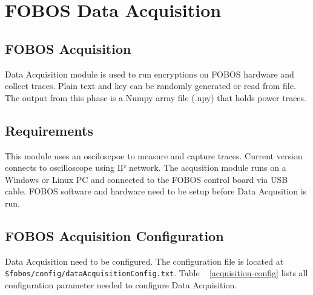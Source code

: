\chapter{FOBOS Data Acquisition} \label{chap:dataAcquisition}

\section{FOBOS Acquisition}
Data Acquisition module is used to run encryptions on FOBOS hardware and collect traces. Plain text and key can be randomly generated or read from file. The output from this phase is a Numpy array file (.npy) that holds power traces.

\section{Requirements}
This module uses an osciloscpoe to measure and capture traces. Current version connects to oscilloscope using IP network.
The acqusition module runs on a Windows or Linux PC and connected to the FOBOS control board via USB cable.
FOBOS software and hardware need to be setup before Data Acqusition is run.

\section{FOBOS Acquisition Configuration}

Data Acquisition need to be configured. The configuration file is located at \texttt{\$fobos/config/dataAcquisitionConfig.txt}.
Table ~ \ref{acquisition-config} lists all configuration parameter needed to configure Data Acquisition.


